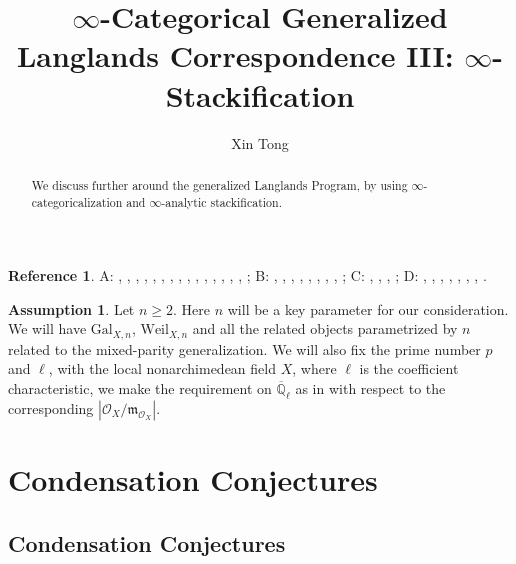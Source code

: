 \documentclass[12pt]{article}
\theoremstyle{definition}
\newtheorem{reference}{Reference}
\newtheorem{assumption}{Assumption}
\begin{document}
\title{$\infty$-Categorical Generalized Langlands Correspondence III: $\infty$-Stackification}
\author{Xin Tong}
\date{}

\maketitle

\begin{abstract}
\noindent We discuss further around the generalized Langlands Program, by using $\infty$-categoricalization and $\infty$-analytic stackification.
\end{abstract}


\newpage

\tableofcontents



\newpage
\begin{reference}
A: \cite{La}, \cite{DHKM}, \cite{DA}, \cite{DB}, \cite{VL}, \cite{DK}, \cite{A}, \cite{XZ}, \cite{GL}, \cite{K1}, \cite{KX}, \cite{BS}, \cite{FS}, \cite{Z}, \cite{EGH}, \cite{CA}; B: \cite{KLA}, \cite{KLB}, \cite{SchA}, \cite{SchB}, \cite{SchC}, \cite{FA}, \cite{Ta}, \cite{BS}, \cite{KPX}; C: \cite{CSA}, \cite{CSB}, \cite{CSC}, \cite{BBBK}; D: \cite{BS2}, \cite{BLA}, \cite{DC}, \cite{SchD}, \cite{SALBRC}, \cite{TA}, \cite{TB}, \cite{TC}. 
\end{reference}

\begin{assumption}
Let $n\geq 2$. Here $n$ will be a key parameter for our consideration. We will have $\mathrm{Gal}_{X,n}$, $\mathrm{Weil}_{X,n}$ and all the related objects parametrized by $n$ related to the mixed-parity generalization. We will also fix the prime number $p$ and $\ell$, with the local nonarchimedean field $X$, where $\ell$ is the coefficient characteristic, we make the requirement on $\overline{\mathbb{Q}}_\ell$ as in \cite{FS} with respect to the corresponding $|\mathcal{O}_X/\mathfrak{m}_{\mathcal{O}_X}|$.
\end{assumption}



\newpage

\section{Condensation Conjectures}

\subsection{Condensation Conjectures}
\end{document}
